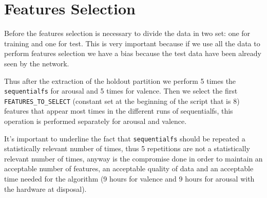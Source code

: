 \documentclass[a4paper]{report}
\begin{document}
	\section{Features Selection}
	\noindent Before the features selection is necessary to divide the data in two set: one for training and one for test. This is very important because if we use all the data to perform features selection we have a bias because the test data have been already seen by the network.
	
	\noindent Thus after the extraction of the holdout partition we perform 5 times the \texttt{sequentialfs} for arousal and 5 times for valence. Then we select the first \texttt{FEATURES\_TO\_SELECT} (constant set at the beginning of the script that is 8) features that appear most times in the different runs of sequentialfs, this operation is performed separately for arousal and valence.
	
	\noindent It's important to underline the fact that \texttt{sequentialfs} should be repeated a statistically relevant number of times, thus 5 repetitions are not a statistically relevant number of times, anyway is the compromise done in order to maintain an acceptable number of features, an acceptable quality of data and an acceptable time needed for the algorithm (9 hours for valence and 9 hours for arousal with the hardware at disposal).
	
\end{document}
